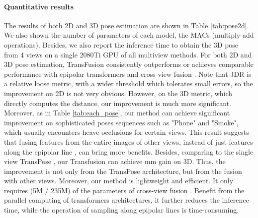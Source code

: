 \documentclass{bmvc2k}
\begin{document}
\vspace{-0.5em}
\paragraph{Quantitative results } 
The results of both 2D and 3D pose estimation are shown in Table \ref{tab:pose2d}. 
We also shown the number of parameters of each model, the MACs (multiply-add operations).
Besides, we also report the inference time to obtain the 3D pose from 4 views on a single 2080Ti GPU of all multiview methods. 
For both 2D and 3D pose estimation, TransFusion consistently outperforms or achieves comparable performance with epipolar transformers \cite{he2020epipolar} and cross-view fusion \cite{qiu2019cross}. 
Note that JDR is a relative loose metric, with a wider threshold which tolerates small errors, so the improvement on 2D is not very obvious. However, on the 3D metric, which directly computes the distance, our improvement is much more significant. Moreover, as in Table \ref{tab:each_pose}, our method can achieve significant improvement on sophisticated poses sequences such as "Phone" and "Smoke", which usually encounters heave occlusions for certain views.  
This result suggests that fusing features from the entire images of other views, instead of just features along the epipolar line \cite{he2020epipolar}, can bring more benefits.  
Besides, comparing to the single view TransPose \cite{yang2020transpose}, our Transfusion can achieve  mm gain on 3D. Thus, the improvement is not only from the TransPose architecture, but from the fusion with other views. 
Moreover, our method is lightweight and efficient. It only requires  (5M / 235M) of the parameters of cross-view fusion \cite{qiu2019cross}. Benefit from the parallel computing of transformers architectures, it further reduces the inference time, while the operation of sampling along epipolar lines \cite{he2020epipolar} is time-consuming. 
\end{document}
